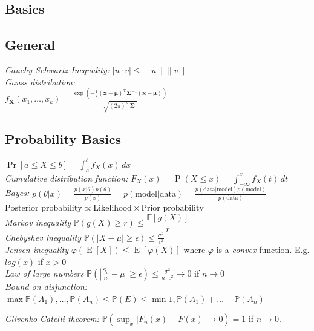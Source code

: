 \documentclass[9pt,parskip]{scrartcl}
\begin{document}
\begin{multicols*}{4}


\section*{Basics}
\subsection*{General}
\textit{Cauchy-Schwartz Inequality: }$|u\cdot v|\le \|u\|\|v\|$ \\
\textit{Gauss distribution:}\\
$f_{\mathbf{X} }(x_{1},\ldots ,x_{k})=\frac {\exp \left(-{\frac {1}{2}}({\mathbf {x} }-{\boldsymbol {\mu }})^{\mathrm {T} }{\boldsymbol {\Sigma }}^{-1}({\mathbf {x} }-{ \boldsymbol {\mu }})\right)}{\sqrt {(2\pi )^{k}|{\boldsymbol {\Sigma }}|}}$ 
\subsection*{Probability Basics}
$\Pr[a\leq X\leq b]=\int _{a}^{b}f_{X}(x)\,dx$ \\
\textit{Cumulative distribution function: } $F_{X}(x)=\operatorname {P} (X\leq x) =\int _{-\infty }^{x}f_{X}(t)\,dt$ \\
\textit{Bayes: } $p(\theta |x)={\frac {p(x|\theta )p(\theta )}{p(x)}} = p(\text{model} | \text{data} )={\frac {p( \text{data}|\text{model} )p(\text{model})}{p(\text{data})}} $ \\
$\text{Posterior probability} \propto \text{Likelihood} \times \text{Prior probability}$ \\
\textit{Markov inequality} $\mathbb{P}(g(X) \geq r) \leq \dfrac{\mathbb{E}[g(X)]}{r}$ \\
\textit{Chebyshev inequality} $\mathbb{P}(|X-\mu|\geq \epsilon) \leq \frac{\sigma^2}{\epsilon^2}$ \\
\textit{Jensen inequality} $\varphi \left(\operatorname {E} [X]\right)\leq \operatorname {E} \left[\varphi (X)\right]$ where $\varphi$ is a \textit{convex} function. E.g. $log(x)$ if $x > 0$ \\
\textit{Law of large numbers} $\mathbb{P}(|\frac{S_n}{n}-\mu|\geq \epsilon) \leq \frac{\sigma^2}{n \cdot \epsilon^2} \to 0$ if $n \to 0$ \\
\textit{Bound on disjunction: }$\max{\mathbb{P}(A_1), \dots , \mathbb{P}(A_n)} \leq \mathbb{P}(E) \leq \min{1, \mathbb{P}(A_1) + \dots + \mathbb{P}(A_n)}$

\textit{Glivenko-Catelli theorem: }$\mathbb{P}(\sup_{x} | F_{n}(x) - F(x)| \to 0)=1$ if $n \to 0$.


\end{multicols*}
\end{document}
